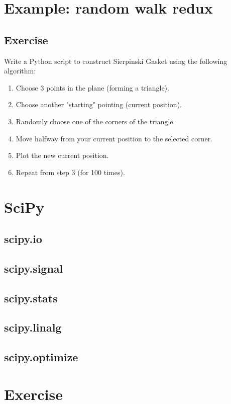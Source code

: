\section{Example: random walk redux}



\subsection{Exercise}
Write a Python script to construct Sierpinski Gasket using the following
algorithm:

\begin{enumerate}
\item Choose 3 points in the plane (forming a triangle).
\item Choose another "starting" pointing (current position).
\item Randomly choose one of the corners of the triangle.
\item Move halfway from your current position to the selected corner.
\item Plot the new current position.
\item Repeat from step 3 (for 100 times).
\end{enumerate}

\section{SciPy}

\subsection{scipy.io}
\subsection{scipy.signal}
\subsection{scipy.stats}
\subsection{scipy.linalg}
\subsection{scipy.optimize}

\section{Exercise}
